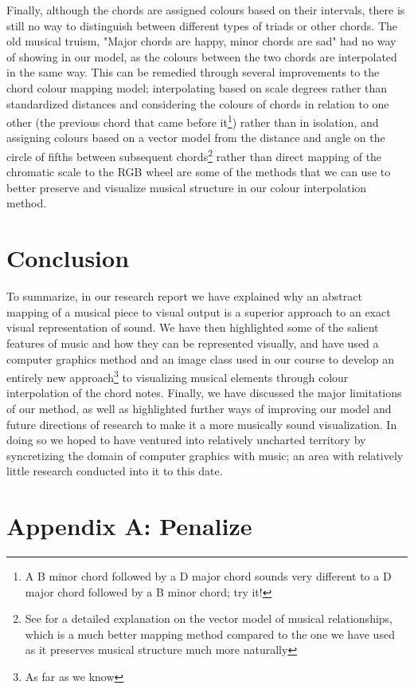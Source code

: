 \documentclass{article}
\begin{document}
Finally, although the chords are assigned colours based on their intervals, there is still no way to distinguish between different types of triads or other chords. The old musical truism, "Major chords are happy, minor chords are sad" had no way of showing in our model, as the colours between the two chords are interpolated in the same way. This can be remedied through several improvements to the chord colour mapping model; interpolating based on scale degrees rather than standardized distances and considering the colours of chords in relation to one other (the previous chord that came before it\footnote{A B minor chord followed by a D major chord sounds very different to a D major chord followed by a B minor chord; try it!}) rather than in isolation, and assigning colours based on a vector model from the distance and angle on the circle of fifths between subsequent chords\footnote{See \cite{ciuha2010visualization} for a detailed explanation on the vector model of musical relationships, which is a much better mapping method compared to the one we have used as it preserves musical structure much more naturally} rather than direct mapping of the chromatic scale to the RGB wheel are some of the methods that we can use to better preserve and visualize musical structure in our colour interpolation method.\\

\section{Conclusion}

To summarize, in our research report we have explained why an abstract mapping of a musical piece to visual output is a superior approach to an exact visual representation of sound. We have then highlighted some of the salient features of music and how they can be represented visually, and have used a computer graphics method and an image class used in our course to develop an entirely new approach\footnote{As far as we know} to visualizing musical elements through colour interpolation of the chord notes. Finally, we have discussed the major limitations of our method, as well as highlighted further ways of improving our model and future directions of research to make it a more musically sound visualization. In doing so we hoped to have ventured into relatively uncharted territory by syncretizing the domain of computer graphics with music; an area with relatively little research conducted into it to this date.

\section{Appendix A: Penalize}
\end{document}
